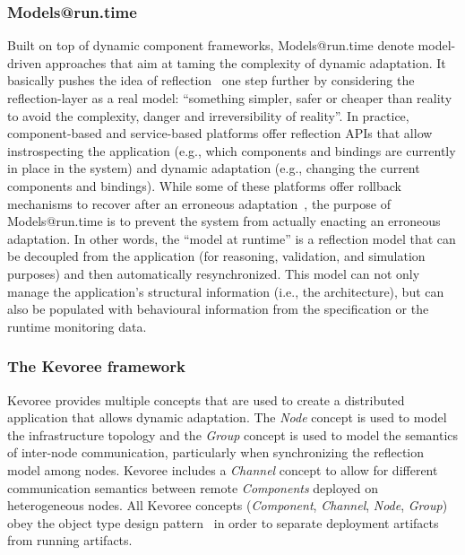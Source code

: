 


\subsubsection{Models@run.time}
Built on top of dynamic component frameworks, Models@run.time denote model-driven approaches that aim at taming the complexity of dynamic adaptation.
It basically pushes the idea of reflection~\cite{morin09a} one step further by considering the reflection-layer as a real model: ``something simpler, safer or cheaper than reality to avoid the complexity, danger and irreversibility of reality''.
In practice, component-based and service-based platforms offer reflection APIs that allow instrospecting the application (e.g., which components and bindings are currently in place in the system) and dynamic adaptation (e.g., changing the current components and bindings).
While some of these platforms offer rollback mechanisms to recover after an erroneous adaptation~\cite{leger2010reliable}, the purpose of Models@run.time is to prevent the system from actually enacting an erroneous adaptation. 
In other words, the ``model at runtime'' is a reflection model that can be decoupled from the application (for reasoning, validation, and simulation purposes) and then automatically resynchronized.
This model can not only manage the application's structural information (i.e., the architecture), but can also be populated with behavioural information from the specification or the runtime monitoring data.


\subsubsection{The Kevoree framework\label{sec:kevoree}}	


Kevoree provides multiple concepts that are used to create a distributed application that allows dynamic adaptation. The \emph{Node} concept is used to model the infrastructure topology and the \emph{Group} concept is used to model the semantics of inter-node communication, particularly when synchronizing the reflection model among nodes. 
Kevoree includes a \emph{Channel} concept to allow for different communication semantics between remote \emph{Components} deployed on heterogeneous nodes. 
All Kevoree concepts (\textit{Component}, \textit{Channel}, \textit{Node}, \textit{Group}) obey the object type design pattern~\cite{johnson_type_1997} in order to separate deployment artifacts from running artifacts.  

